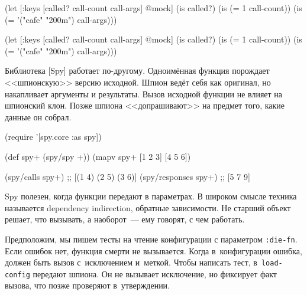 \ifx\DEVICETYPE\MOBILE

\begin{english}
  \begin{clojure}
(let [{:keys [called?
              call-count
              call-args]} @mock]
  (is called?)
  (is (= 1 call-count))
  (is (= '("cafe" "200m") call-args)))
  \end{clojure}
\end{english}

\else

\begin{english}
  \begin{clojure}
(let [{:keys [called? call-count call-args]} @mock]
  (is called?)
  (is (= 1 call-count))
  (is (= '("cafe" "200m") call-args)))
  \end{clojure}
\end{english}

\fi


Библиотека [Spy] работает
по-другому. Одноимённая функция порождает <<шпионскую>> версию исходной. Шпион
ведёт себя как оригинал, но накапливает аргументы и результаты. Вызов исходной
функции не влияет на шпионский клон. Позже шпиона <<допрашивают>> на предмет
того, какие данные он собрал.

\begin{english}
  \begin{clojure}
(require '[spy.core :as spy])

(def spy+ (spy/spy +))
(mapv spy+ [1 2 3] [4 5 6])

(spy/calls spy+)
;; [(1 4) (2 5) (3 6)]
(spy/responses spy+)
;; [5 7 9]
  \end{clojure}
\end{english}



Spy полезен, когда функции передают в параметрах. В широком смысле техника
называется dependency indirection, обратные зависимости. Не старший объект
решает, что вызывать, а наоборот~--- ему говорят, с чем работать.

Предположим, мы пишем тесты на чтение конфигурации с параметром
\verb|:die-fn|. Если ошибок нет, функция смерти не вызывается. Когда
в~конфигурации ошибка, должен быть вызов с~исключением и~меткой. Чтобы написать
тест, в~\verb|load-config| передают шпиона. Он не вызывает исключение, но
фиксирует факт вызова, что позже проверяют в~утверждении.

